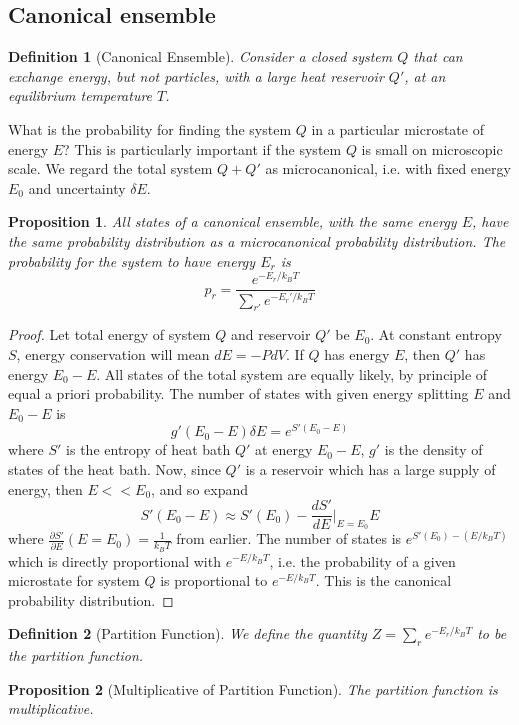 \documentclass[a4paper]{article}
\theoremstyle{new}
\newtheorem{defi}{Definition}[section]
\newtheorem{prop}{Proposition}[section]
\begin{document}
\subsection{Canonical ensemble}
\begin{defi}[Canonical Ensemble]
Consider a closed system $Q$ that can exchange energy, but not particles, with a large heat reservoir $Q'$, at an equilibrium temperature $T$.
\end{defi}
What is the probability for finding the system $Q$ in a particular microstate of energy $E$? This is particularly important if the system $Q$ is small on microscopic scale. We regard the total system $Q+Q'$ as microcanonical, i.e. with fixed energy $E_0$ and uncertainty $\delta E$.
\begin{prop}
All states of a canonical ensemble, with the same energy $E$, have the same probability distribution as a microcanonical probability distribution. The probability for the system to have energy $E_r$ is
\begin{equation}
p_r=\frac{e^{-E_r/k_BT}}{\sum_{r'}e^{-E_r'/k_BT}}\label{canonical}
\end{equation}
\end{prop}
\begin{proof}
Let total energy of system $Q$ and reservoir $Q'$ be $E_0$. At constant entropy $S$, energy conservation will mean $dE=-PdV$. If $Q$ has energy $E$, then $Q'$ has energy $E_0-E$. All states of the total system are equally likely, by principle of equal a priori probability. The number of states with given energy splitting $E$ and $E_0-E$ is
$$g'(E_0-E)\delta E=e^{S'(E_0-E)}$$
where $S'$ is the entropy of heat bath $Q'$ at energy $E_0-E$, $g'$ is the density of states of the heat bath. Now, since $Q'$ is a reservoir which has a large supply of energy, then $E<<E_0$, and so expand
$$S'(E_0-E)\approx S'(E_0)-\frac{dS'}{dE}\bigg|_{E=E_0}E$$
where $\frac{\partial S'}{\partial E}(E=E_0)=\frac{1}{k_BT}$ from earlier. The number of states is $e^{S'(E_0)-(E/k_BT)}$ which is directly proportional with $e^{-E/k_BT}$, i.e. the probability of a given microstate for system $Q$ is proportional to $e^{-E/k_BT}$. This is the canonical probability distribution.
\end{proof}
\begin{defi}[Partition Function]
We define the quantity $Z=\sum_re^{-E_r/k_BT}$ to be the partition function.
\end{defi}
\begin{prop}[Multiplicative of Partition Function]
The partition function is multiplicative.
\end{prop}
\end{document}
